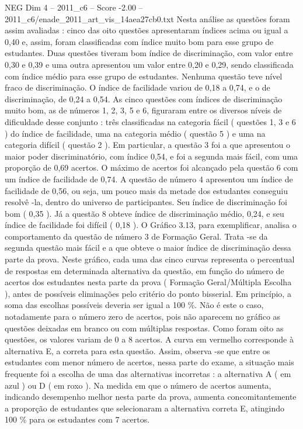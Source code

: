 \begin{textsample}{NEG Dim 4 – 2011\_c6 – Score -2.00 – 2011\_c6/enade\_2011\_art\_vis\_14aea27cb0.txt}
Nesta análise as questões foram assim avaliadas : cinco das oito questões apresentaram índices acima ou igual a 0,40 e, assim, foram classificadas com índice muito bom para esse grupo de estudantes.
Duas questões tiveram bom índice de discriminação, com valor entre 0,30 e 0,39 e uma outra apresentou um valor entre 0,20 e 0,29, sendo classificada com índice médio para esse grupo de estudantes.
Nenhuma questão teve nível fraco de discriminação.
O índice de facilidade variou de 0,18 a 0,74, e o de discriminação, de 0,24 a 0,54.
As cinco questões com índices de discriminação muito bom, as de números 1, 2, 3, 5 e 6, figuraram entre os diversos níveis de dificuldade desse conjunto : três classificadas na categoria fácil ( questões 1, 3 e 6 ) do índice de facilidade, uma na categoria médio ( questão 5 ) e uma na categoria difícil ( questão 2 ).
Em particular, a questão 3 foi a que apresentou o maior poder discriminatório, com índice 0,54, e foi a segunda mais fácil, com uma proporção de 0,69 acertos.
O máximo de acertos foi alcançado pela questão 6 com um índice de facilidade de 0,74.
A questão de número 4 apresentou um índice de facilidade de 0,56, ou seja, um pouco mais da metade dos estudantes conseguiu resolvê -la, dentro do universo de participantes.
Seu índice de discriminação foi bom ( 0,35 ).
Já a questão 8 obteve índice de discriminação médio, 0,24, e seu índice de facilidade foi difícil ( 0,18 ).
O Gráfico 3.13, para exemplificar, analisa o comportamento da questão de número 3 de Formação Geral.
Trata -se da segunda questão mais fácil e a que obteve o maior índice de discriminação dessa parte da prova.
Neste gráfico, cada uma das cinco curvas representa o percentual de respostas em determinada alternativa da questão, em função do número de acertos dos estudantes nesta parte da prova ( Formação Geral/Múltipla Escolha ), antes de possíveis eliminações pelo critério do ponto bisserial.
Em princípio, a soma das escolhas possíveis deveria ser igual a 100 \%.
Não é este o caso, notadamente para o número zero de acertos, pois não aparecem no gráfico as questões deixadas em branco ou com múltiplas respostas.
Como foram oito as questões, os valores variam de 0 a 8 acertos.
A curva em vermelho corresponde à alternativa E, a correta para esta questão.
Assim, observa -se que entre os estudantes com menor número de acertos, nessa parte do exame, a situação mais frequente foi a escolha de uma das alternativas incorretas : a alternativa A ( em azul ) ou D ( em roxo ).
Na medida em que o número de acertos aumenta, indicando desempenho melhor nesta parte da prova, aumenta concomitantemente a proporção de estudantes que selecionaram a alternativa correta E, atingindo 100 \% para os estudantes com 7 acertos.

\end{textsample}
